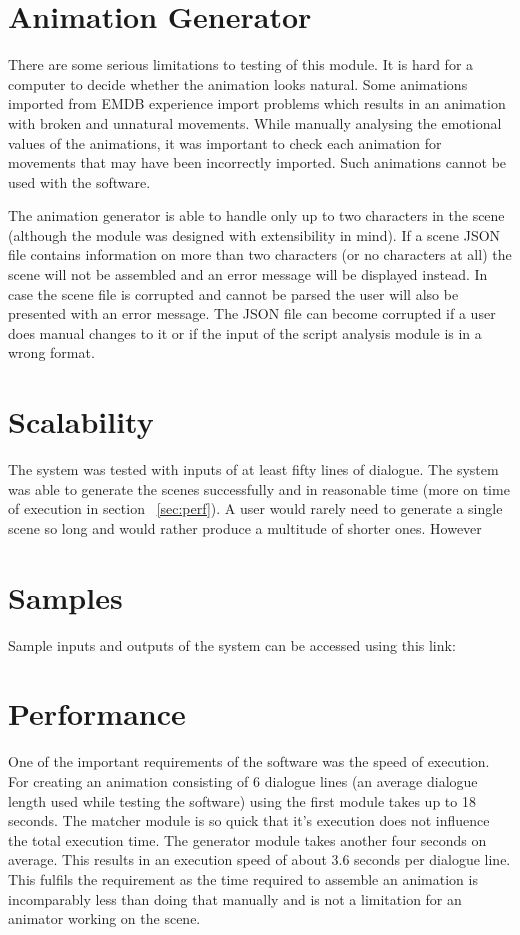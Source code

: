 \section{Animation Generator}
There are some serious limitations to testing of this module. It is hard for a computer to decide whether the animation looks natural. Some animations imported from EMDB experience import problems which results in an animation with broken and unnatural movements. While manually analysing the emotional values of the animations, it was important to check each animation for movements that may have been incorrectly imported. Such animations cannot be used with the software.

The animation generator is able to handle only up to two characters in the scene (although the module was designed with extensibility in mind). If a scene JSON file contains information on more than two characters (or no characters at all) the scene will not be assembled and an error message will be displayed instead. In case the scene file is corrupted and cannot be parsed the user will also be presented with an error message. The JSON file can become corrupted if a user does manual changes to it or if the input of the script analysis module is in a wrong format.

\section{Scalability}
The system was tested with inputs of at least fifty lines of dialogue. The system was able to generate the scenes successfully and in reasonable time (more on time of execution in section ~\ref{sec:perf}). A user would rarely need to generate a single scene so long and would rather produce a multitude of shorter ones. However

\section{Samples}
Sample inputs and outputs of the system can be accessed using this link: \videoshost

\section{Performance \label{sec:perf}}
One of the important requirements of the software was the speed of execution. For creating an animation consisting of 6 dialogue lines (an average dialogue length used while testing the software) using the first module takes up to 18 seconds. The matcher module is so quick that it's execution does not influence the total execution time. The generator module takes another four seconds on average. This results in an execution speed of about 3.6 seconds per dialogue line. This fulfils the requirement as the time required to assemble an animation is incomparably less than doing that manually and is not a limitation for an animator working on the scene.